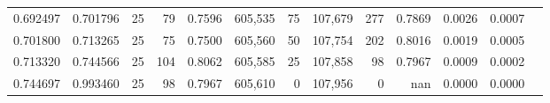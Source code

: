 \begin{tabular}{rrrrrrrrrrrrr}
0.692497 & 0.701796 &    25 &  79 &                                     0.7596 & 605,535 &      75 & 107,679 &     277 & 0.7869 & 0.0026 & 0.0007 \\
0.701800 & 0.713265 &    25 &  75 &                                     0.7500 & 605,560 &      50 & 107,754 &     202 & 0.8016 & 0.0019 & 0.0005 \\
0.713320 & 0.744566 &    25 & 104 &                                     0.8062 & 605,585 &      25 & 107,858 &      98 & 0.7967 & 0.0009 & 0.0002 \\
0.744697 & 0.993460 &    25 &  98 &                                     0.7967 & 605,610 &       0 & 107,956 &       0 &    nan & 0.0000 & 0.0000 \\
\bottomrule
\end{tabular}
